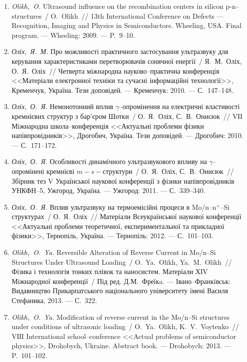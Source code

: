 \begin{enumerate}[label=\arabic*.,leftmargin=2em,itemindent=0cm]
  \item
\emph{Olikh,~O.} Ultrasound influence on the recombination centers in
  silicon p-n--structures~/ O.~Olikh~// 13th International Conference on
  Defects --- Recognition, Imaging and Physics in Semiconductors. Wheeling,
  {USA}. Final program. ---
Wheeling: 2009. ---
P.~9--10.


\item
\emph{Оліх,~Я.~М.} Про можливості практичного
  застосування ультразвуку для керування
  характеристиками перетворювачів
  сонячної енергії~/ Я.~М.~Оліх, О.~Я.~Оліх~//
  Четверта міжнародна науково--практична
  конференція <<Матеріали електронної
  техніки та сучасні інформаційні
  технології>>, {К}ременчук, {У}країна. Тези
  доповідей. ---
  {К}ременчук: 2010. ---
  {С.}~147--148.

\item
\emph{Оліх,~О.~Я.} Немонотонний вплив
  $\gamma$--опромінення на електричні
  властивості кремнієвих структур з
  бар’єром {Ш}отки~/ О.~Я.~Оліх, С.~В.~Онисюк~//
  {VІI} {М}іжнародна школа--конференція
  <<Актуальні проблеми фізики
  напівпровідників>>, {Д}рогобич, {У}країна.
  Тези доповідей. ---
  Дрогобич: 2010. ---
  {С.}~171--172.

\item
\emph{Оліх,~О.~Я.} Особливості динамічного
  ультразвукового впливу на
  $\gamma$--опромінені кремнієві $m-s-$структури~/
  О.~Я.~Оліх, С.~В.~Онисюк~// Збірник тез {V}
  {У}країнської наукової конференції з
  фізики напівпровідників {УНКФН}--5,
  Ужгород, {У}країна. ---
  Ужгород: 2011. ---
  {С.}~339--340.

\item
\emph{Оліх,~О.~Я.} Вплив ультразвуку на
  термоемісійні процеси в Mo/n--n$^+$--Si
  структурах~/ О.~Я.~Оліх~// Матеріали
  {В}сеукраїнської наукової конференції
  <<Актуальні проблеми теоретичної,
  експериментальної та прикладної фізики>>,
  {Т}ернопіль, {У}країна. ---
  Тернопіль: 2012. ---
  {С.}~101--103.

\item
\emph{Olikh,~O.~Ya.} Reversible Alteration of Reverse Current in Mo/n--Si
  Structures Under Ultrasound Loading~/ O.~Ya.~Olikh, Ya.~M.~Olikh~//
  Фізика і технологія тонких плівок та
  наносистем. {М}атеріали {ХІV} Міжнародної
  конференції~/ {Під ред. }Д.М.~Фреїкa. ---
  Івано--Франківськ: Видавництво
  {П}рикарпатського національного
  університету імені {В}асиля {С}тефаника,
  2013. ---
  {С.}~322.

\item
\emph{Olikh,~O.~Ya.} Modification of reverse current in the Mo/n--Si
  structures under conditions of ultrasonic loading~/ O.~Ya.~Olikh,
  K.~V.~Voytenko~// {VІІI} {I}nternational school--conference <<Actual
  problems of semiconductor physics>>, {D}rohobych, {U}kraine. Abstract book.
  ---
  Drohobych: 2013. ---
  P.~101--102.


\end{enumerate}
